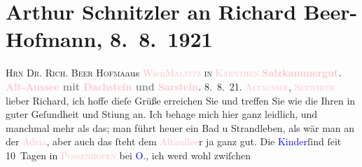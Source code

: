 

               \section[Arthur Schnitzler an Richard Beer-Hofmann, 8. 8. 1921]{ Arthur Schnitzler an Richard Beer-Hofmann, 8. 8. 1921}\nopagebreak{}\rehead{ }\normalsize\beginnumbering{} \toendnotes[C]{\smallbreak\pagebreak[2]} 
\toendnotes[C]{\smallbreak}\pstart{}{\pb}\textsc{Hrn Dr. Rich. Beer Hofma{\geminationn}}\pend{}\pstart{}aus \textcolor{pink}{Wien}{}\ledrightnote{\textcolor{pink}{Wien}}\pend{}\pstart{}\textsc{\textcolor{pink}{Malnitz}{}\ledrightnote{\textcolor{pink}{Mallnitz}} in \textcolor{pink}{Kärnthen}{}\ledrightnote{\textcolor{pink}{Kärnten}}}\pend{}{\bigskip}\pstart
           \noindent{}\centering{}{\pb}\textcolor{gray}{\textbf{\textcolor{pink}{Salzkammergut}{}\ledrightnote{\textcolor{pink}{Salzkammergut}}. \textcolor{pink}{Alt-Aussee}{}\ledrightnote{\textcolor{pink}{Altaussee}} mit \textcolor{pink}{Dachstein}{}\ledrightnote{\textcolor{pink}{Dachstein}} und \textcolor{pink}{Sarstein}{}\ledrightnote{\textcolor{pink}{Sarstein}}.}}\pend
           \pstart
           \raggedleft{}8. 8. 21. \textsc{\textcolor{pink}{Altaussee}{}\ledrightnote{\textcolor{pink}{Altaussee}}, \textcolor{pink}{Seewirth}{}\ledrightnote{\textcolor{pink}{Seewirt}}}\pend
           \pstart
           lieber Richard, ich hoffe dieſe Grüße erreichen Sie und treffen Sie
               wie die Ihren in guter Geſundheit und Sti{\geminationm}ung an. Ich
               behage mich hier ganz leidlich, und manchmal mehr als das; man führt heuer ein Bad u
               Strandleben, als wär man an der \textcolor{pink}{Adria}{}\ledrightnote{\textcolor{pink}{Adriatisches Meer}}, aber auch das
               ſteht dem {\pb}\textcolor{pink}{Altauſſee}{}\ledrightnote{\textcolor{pink}{Altaussee}}r ja ganz gut. Die \textcolor{blue}{Kinder}{}ſind ſeit 10 Tagen in \textcolor{pink}{\textsc{Possenhofen}}{}\ledrightnote{\textcolor{pink}{Possenhofen}} bei \textcolor{blue}{O.}{}\ledrightnote{\textcolor{blue}{Olga Schnitzler}}, ich werd wohl zwiſchen
